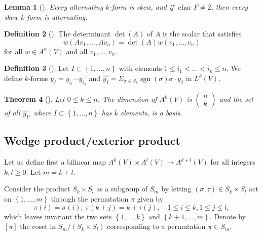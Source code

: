 \documentclass[reqno]{amsart}
\newtheorem{theorem}{Theorem}[section]
\newtheorem{lemma}[theorem]{Lemma}
\theoremstyle{definition}
\newtheorem{definition}[theorem]{Definition}
\theoremstyle{remark}
\DeclareMathOperator{\sgn}{sgn}
\DeclareMathOperator{\Char}{char}
\begin{document}
     \begin{lemma}[]
         Every alternating $k$-form is skew, and
         if $\Char F \neq 2$, then every skew
         $k$-form is alternating.
     \end{lemma}

     \begin{definition}[]
         The determinant $\det (A)$ of $A$ is
         the scalar that satisfies
         \[
         w \left( A v_1, \ldots, Av_n \right) 
         = \det \left( A \right) 
         w \left( v_1, \ldots, v_n \right) 
         \] 
         for all $w \in A^{n}(V)$ and all $v_1,\ldots, v_n$.
     \end{definition}

     \begin{definition}[]
         Let $I \subset \left\{ 1,\ldots, n \right\} $ with
         elements $1 \le i_1 < \ldots < i_k \le n$.
         We define $k$-forms $y_I = 
         y_{i_1} \cdots y_{i_k}$ and
         $\widehat{y_I} = 
         \Sigma_{\sigma \in S_k} \sgn (\sigma)
         \sigma \cdot y_I$ in $L^{k}(V)$.
     \end{definition}

     \begin{theorem}[]
         Let $0 \le k \le n$. The dimension
         of $A^{k}(V)$ is 
         $\begin{pmatrix} n\\k \end{pmatrix} $ and the
         set of all $\widehat{y_I}$, where
         $I \subset \left\{ 1, \ldots, n \right\} $ has
         $k$ elements, is a basis.
     \end{theorem}

     \subsection{Wedge product/exterior product}

     Let us define first a bilinear map
      $A^{k}(V) \times A^{l}(V) \to A^{k+l}(V)$
      for all integers $k,l\ge 0$.
      Let $m = k+l$.

      Consider the product $S_k \times S_l$ as a
      subgroup of $S_m$ by letting
      $\left( \sigma, \tau \right) \in 
      S_k \times S_l$ act
      on $\left\{ 1, \ldots, m \right\} $ through the
      permutation $\pi$ given by
      \[
      \pi(i) = \sigma(i), \,
      \pi(k+j) = k + \tau(j), \quad
      1 \le i \le k, 1 \le j \le l,
      \] 
      which leaves invariant the two sets
      $\left\{ 1,\ldots, k \right\} $ and
      $\left\{ k+1,\ldots,m \right\} $.
      Denote by $\left[ \pi \right] $ the coset
      in $S_m / \left( S_k \times S_l \right) $ corresponding
      to a permutation $\pi \in S_m$.
\end{document}
